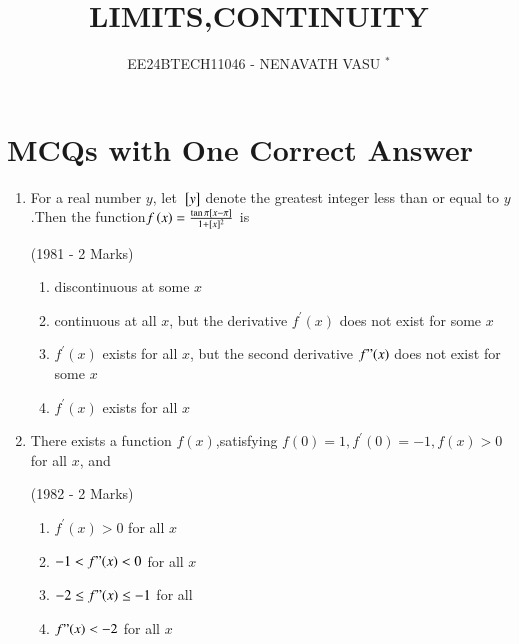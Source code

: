 \documentclass[journal,12pt,onecolumn]{IEEEtran}
\theoremstyle{remark}
\begin{document}

\vspace{3cm}

\title{LIMITS,CONTINUITY}
\author{EE24BTECH11046 - NENAVATH VASU $^{*}$%
}
\maketitle
\bigskip

\renewcommand{\thefigure}{\theenumi}
\renewcommand{\thetable}{\theenumi}


\section{ MCQs with One Correct Answer}



\begin{enumerate}
   
\item For a real number $y$, let ${}\left[y\right]$ denote the greatest integer less than or equal to $y$.Then the function{$f\left(x\right)=\frac{\tan\pi{}\left[x-\pi\right]}{1+[x]^2}$} is

\hfill                    (1981 - 2 Marks)
   \begin{enumerate}
       \item discontinuous at some $x$
        \item continuous at all $x$, but the derivative $f^{\prime}(x)$ does not exist for some $x$
        \item $f^{\prime}(x)$ exists for all $x$, but the second derivative $f"(x)$ does not exist for some $x$
        \item $f^{\prime}(x)$ exists for all $x$
   \end{enumerate}




\item There exists a function $f(x)$,satisfying $f(0)=1,f^{\prime}(0)=-1,f(x)>0$ for all $x$, and 

\hfill      (1982 - 2 Marks)
    \begin{enumerate}

          \item $f^{\prime}(x) > 0$ for all $x$
          \item$ -1 < f"(x) < 0$ for all $x$
          \item $-2 \leq f"(x) \leq -1$ for  all 
          \item $f"(x) < -2$ for all $x$

          
          

\end{enumerate}
\end{enumerate}
\end{document}
